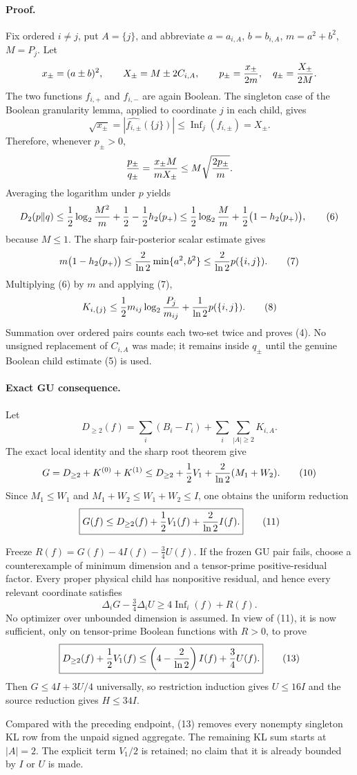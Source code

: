 \paragraph{Proof.}
Fix ordered $i\ne j$, put $A=\{j\}$, and abbreviate $a=a_{i,A}$,
$b=b_{i,A}$, $m=a^2+b^2$, $M=P_j$.  Let
\[
 x_\pm=(a\pm b)^2,
 \qquad X_\pm=M\pm2C_{i,A},
 \qquad p_\pm={x_\pm\over2m},\quad q_\pm={X_\pm\over2M}.
\]
The two functions $f_{i,+}$ and $f_{i,-}$ are again Boolean.  The
singleton case of the Boolean granularity lemma, applied to coordinate
$j$ in each child, gives
\[
 \sqrt{x_\pm}=|\widehat {f_{i,\pm}}(\{j\})|
 \le\operatorname{Inf}_j(f_{i,\pm})=X_\pm.             \tag{5}
\]
Therefore, whenever $p_\pm>0$,
\[
 {p_\pm\over q_\pm}
 ={x_\pm M\over mX_\pm}
 \le M\sqrt{{2p_\pm\over m}}.
\]
Averaging the logarithm under $p$ yields
\[
 D_2(p\|q)
 \le {1\over2}\log_2{M^2\over m}+{1\over2}
       -{1\over2}h_2(p_+)
 \le {1\over2}\log_2{M\over m}
       +{1\over2}\bigl(1-h_2(p_+)\bigr),              \tag{6}
\]
because $M\le1$.  The sharp fair-posterior scalar estimate gives
\[
 m\bigl(1-h_2(p_+)\bigr)
 \le {2\over\ln2}\min\{a^2,b^2\}
 \le {2\over\ln2}p(\{i,j\}).                          \tag{7}
\]
Multiplying (6) by $m$ and applying (7),
\[
 K_{i,\{j\}}
 \le {1\over2}m_{ij}\log_2{P_j\over m_{ij}}
       +{1\over\ln2}p(\{i,j\}).                       \tag{8}
\]
Summation over ordered pairs counts each two-set twice and proves (4).
No unsigned replacement of $C_{i,A}$ was made; it remains inside $q_\pm$
until the genuine Boolean child estimate (5) is used.

\paragraph{Exact GU consequence.}
Let
\[
 D_{\ge2}(f)=\sum_i(B_i-\Gamma_i)
 +\sum_i\sum_{|A|\ge2}K_{i,A}.                         \tag{9}
\]
The exact local identity and the sharp root theorem give
\[
 G=D_{\ge2}+K^{(0)}+K^{(1)}
 \le D_{\ge2}+{1\over2}V_1
       +{2\over\ln2}(M_1+W_2).                        \tag{10}
\]
Since $M_1\le W_1$ and
$M_1+W_2\le W_1+W_2\le I$, one obtains the uniform reduction
\[
 \boxed{G(f)\le D_{\ge2}(f)+{1\over2}V_1(f)
                    +{2\over\ln2}I(f).}               \tag{11}
\]

Freeze $R(f)=G(f)-4I(f)-\tfrac34U(f)$.  If the frozen GU pair fails,
choose a counterexample of minimum dimension and a tensor-prime
positive-residual factor.  Every proper physical child has nonpositive
residual, and hence every relevant coordinate satisfies
\[
 \Delta_iG-\tfrac34\Delta_iU
 \ge4\operatorname{Inf}_i(f)+R(f).                    \tag{12}
\]
No optimizer over unbounded dimension is assumed.  In view of (11), it is
now sufficient, only on tensor-prime Boolean functions with $R>0$, to prove
\[
 \boxed{
 D_{\ge2}(f)+{1\over2}V_1(f)
 \le\left(4-{2\over\ln2}\right)I(f)+{3\over4}U(f).}   \tag{13}
\]
Then $G\le4I+3U/4$ universally, so restriction induction gives
$U\le16I$ and the source reduction gives $H\le34I$.

Compared with the preceding endpoint, (13) removes every nonempty
singleton KL row from the unpaid signed aggregate.  The remaining KL sum
starts at $|A|=2$.  The explicit term $V_1/2$ is retained; no claim that it
is already bounded by $I$ or $U$ is made.
